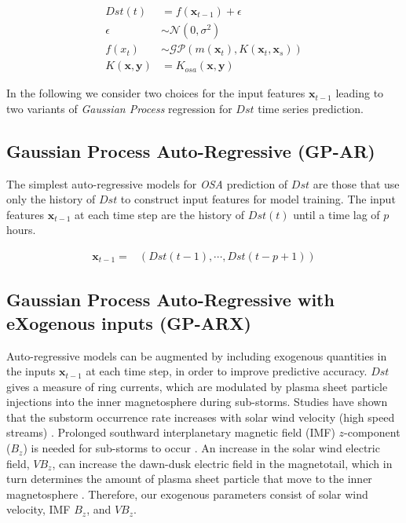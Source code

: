\documentclass[draft,sw]{AGUTeX}
\begin{document}
\begin{article}
\begin{align}
    Dst(t) & =  f(\mathbf{x}_{t-1}) + \epsilon \label{eq:Dst} \\
    \epsilon & \sim  \mathcal{N}(0, \sigma^2) \label{eq:GPNoise} \\
    f(x_t) & \sim  \mathcal{GP}(m(\mathbf{x}_t), K(\mathbf{x}_t, \mathbf{x}_s)) \label{eq:DstGP} \\
    K(\mathbf{x}, \mathbf{y}) & =  K_{osa}(\mathbf{x}, \mathbf{y}) \label{eq:GPPoly}
\end{align}

In the following we consider two choices for the input features $\mathbf{x}_{t-1}$ leading to two variants of \emph{Gaussian Process} regression for $Dst$ time series prediction.

\subsection{Gaussian Process Auto-Regressive (GP-AR)} \label{sec:gpar}

The simplest auto-regressive models for \emph{OSA} prediction of $Dst$ are those that use only the history of $Dst$ to construct input features for model training. The input features $\mathbf{x}_{t-1}$ at each time step are the history of $Dst(t)$ until a time lag of $p$ hours.

\begin{align*}
    \mathbf{x}_{t-1} = & \left(Dst(t-1), \cdots , Dst(t-p+1)\right)
\end{align*}

\subsection{Gaussian Process Auto-Regressive with eXogenous inputs (GP-ARX)} \label{sec:gparx}

Auto-regressive models can be augmented by including exogenous quantities in the inputs $\mathbf{x}_{t-1}$ at each time step, in order to improve predictive accuracy. $Dst$ gives a measure of ring currents, which are modulated by plasma sheet particle injections into the inner magnetosphere during sub-storms. Studies have shown that the substorm occurrence rate increases with solar wind velocity (high speed streams) \citep{Kissinger2011,Newell2016}. Prolonged southward interplanetary magnetic field (IMF) $z$-component ($B_z$) is needed for sub-storms to occur \citep{McPherron1986}. An increase in the solar wind electric field, $VB_z$, can increase the dawn-dusk electric field in the magnetotail, which in turn determines the amount of plasma sheet particle that move to the inner magnetosphere \citep{Friedel2001}. Therefore, our exogenous parameters consist of solar wind velocity, IMF $B_z$, and $VB_z$.   


\end{article}
\end{document}
